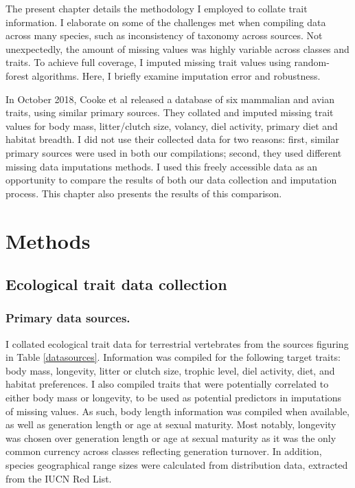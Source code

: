 The present chapter details the methodology I employed to collate trait information. I elaborate on some of the challenges met when compiling data across many species, such as inconsistency of taxonomy across sources. Not unexpectedly, the amount of missing values was highly variable across classes and traits. To achieve full coverage, I imputed missing trait values using random-forest algorithms. Here, I briefly examine imputation error and robustness. 

In October 2018, Cooke et al released a database of six mammalian and avian traits, using similar primary sources. They collated and imputed missing trait values for body mass, litter/clutch size, volancy, diel activity, primary diet and habitat breadth. I did not use their collected data for two reasons: first, similar primary sources were used in both our compilations; second, they used different missing data imputations methods. I used this freely accessible data as an opportunity to compare the results of both our data collection and imputation process. This chapter also presents the results of this comparison.



\pagebreak
\section{Methods}

\subsection{Ecological trait data collection}

\subsubsection{Primary data sources.}
I collated ecological trait data for terrestrial vertebrates from the sources figuring in Table \ref{datasources}. Information was compiled for the following target traits: body mass, longevity, litter or clutch size, trophic level, diel activity, diet, and habitat preferences. I also compiled traits that were potentially correlated to either body mass or longevity, to be used as potential predictors in imputations of missing values. As such, body length information was compiled when available, as well as generation length or age at sexual maturity. Most notably, longevity was chosen over generation length or age at sexual maturity as it was the only common currency across classes reflecting generation turnover. In addition, species geographical range sizes were calculated from distribution data, extracted from the IUCN Red List.

